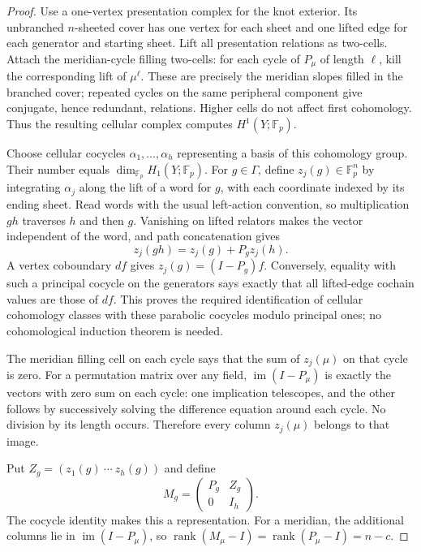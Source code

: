 \documentclass[11pt]{article}
\newcommand{\F}{\mathbb F}
\newcommand{\rk}{\operatorname{rank}}
\begin{document}
\begin{proof}
Use a one-vertex presentation complex for the knot exterior.
Its unbranched $n$-sheeted cover has one vertex for each sheet and
one lifted edge for each generator and starting sheet.
Lift all presentation relations as two-cells.
Attach the meridian-cycle filling two-cells: for each cycle of
$P_\mu$ of length $\ell$, kill the corresponding lift of $\mu^\ell$.
These are precisely the meridian slopes filled in the branched
cover; repeated cycles on the same peripheral component give
conjugate, hence redundant, relations. Higher cells do not affect
first cohomology. Thus the resulting cellular complex computes
$H^1(Y;\F_p)$.

Choose cellular cocycles $\alpha_1,\ldots,\alpha_h$ representing a
basis of this cohomology group. Their number equals
$\dim_{\F_p}H_1(Y;\F_p)$.
For $g\in\Gamma$, define $z_j(g)\in\F_p^n$ by integrating
$\alpha_j$ along the lift of a word for $g$, with each coordinate
indexed by its ending sheet. Read words with the usual left-action
convention, so multiplication $gh$ traverses $h$ and then $g$.
Vanishing on lifted relators makes the vector independent of the
word, and path concatenation gives
\[
                     z_j(gh)=z_j(g)+P_gz_j(h).
\]
A vertex coboundary $df$ gives
$z_j(g)=(I-P_g)f$. Conversely, equality with such a principal cocycle
on the generators says exactly that all lifted-edge cochain values
are those of $df$. This proves the required identification of
cellular cohomology classes with these parabolic cocycles modulo
principal ones; no cohomological induction theorem is needed.

The meridian filling cell on each cycle says that the sum of
$z_j(\mu)$ on that cycle is zero.
For a permutation matrix over any field,
$\operatorname{im}(I-P_\mu)$ is exactly the vectors with zero sum on
each cycle: one implication telescopes, and the other follows by
successively solving the difference equation around each cycle.
No division by its length occurs.
Therefore every column $z_j(\mu)$ belongs to that image.

Put $Z_g=(z_1(g)\ \cdots\ z_h(g))$ and define
\[
                       M_g=
                       \begin{pmatrix}P_g&Z_g\\0&I_h\end{pmatrix}.
\]
The cocycle identity makes this a representation.
For a meridian, the additional columns lie in
$\operatorname{im}(I-P_\mu)$, so
$\rk(M_\mu-I)=\rk(P_\mu-I)=n-c$.


\end{proof}
\end{document}
